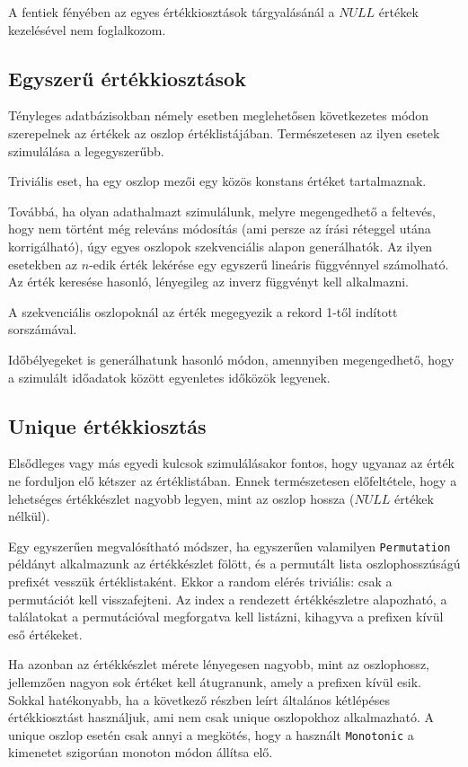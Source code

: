 \documentclass[
    parspace,
    noindent,
    nohyp,
]{elteiktdk}[2023/04/10]
\begin{document}
A fentiek fényében az egyes értékkiosztások tárgyalásánál a $NULL$ értékek kezelésével nem foglalkozom.

\subsection{Egyszerű értékkiosztások}

Tényleges adatbázisokban némely esetben meglehetősen következetes módon
szerepelnek az értékek az oszlop értéklistájában.
Természetesen az ilyen esetek szimulálása a legegyszerűbb.

Triviális eset, ha egy oszlop mezői egy közös konstans értéket tartalmaznak.

Továbbá, ha olyan adathalmazt szimulálunk, melyre megengedhető a feltevés,
hogy nem történt még releváns módosítás
(ami persze az írási réteggel utána korrigálható),
úgy egyes oszlopok szekvenciális alapon generálhatók.
Az ilyen esetekben az $n$-edik érték lekérése
egy egyszerű lineáris függvénnyel számolható.
Az érték keresése hasonló, lényegileg az inverz függvényt kell alkalmazni.

A szekvenciális oszlopoknál az érték megegyezik a rekord 1-től indított sorszámával.

Időbélyegeket is generálhatunk hasonló módon,
amennyiben megengedhető, hogy a szimulált időadatok között egyenletes időközök legyenek.

\subsection{Unique értékkiosztás}

Elsődleges vagy más egyedi kulcsok szimulálásakor fontos,
hogy ugyanaz az érték ne forduljon elő kétszer az értéklistában.
Ennek természetesen előfeltétele,
hogy a lehetséges értékkészlet nagyobb legyen, mint az oszlop hossza
($NULL$ értékek nélkül).

Egy egyszerűen megvalósítható módszer,
ha egyszerűen valamilyen \texttt{Permutation} példányt alkalmazunk az értékkészlet fölött,
és a permutált lista oszlophosszúságú prefixét vesszük értéklistaként.
Ekkor a random elérés triviális: csak a permutációt kell visszafejteni.
Az index a rendezett értékkészletre alapozható,
a találatokat a permutációval megforgatva kell listázni,
kihagyva a prefixen kívül eső értékeket.

Ha azonban az értékkészlet mérete lényegesen nagyobb, mint az oszlophossz,
jellemzően nagyon sok értéket kell átugranunk, amely a prefixen kívül esik.
Sokkal hatékonyabb, ha a következő részben leírt általános kétlépéses értékkiosztást használjuk,
ami nem csak unique oszlopokhoz alkalmazható.
A unique oszlop esetén csak annyi a megkötés, hogy a használt \texttt{Monotonic}
a kimenetet szigorúan monoton módon állítsa elő.
\end{document}
